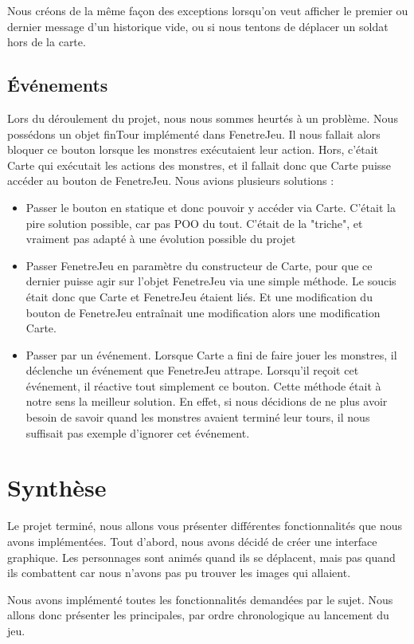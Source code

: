 \documentclass{article}
\begin{document}
  Nous créons de la même façon des exceptions lorsqu'on veut afficher le premier ou dernier message d'un historique vide, ou si nous tentons de déplacer un soldat hors de la carte.

  \subsection{Événements}
  Lors du déroulement du projet, nous nous sommes heurtés à un problème.
  Nous possédons un objet finTour implémenté dans FenetreJeu.
  Il nous fallait alors bloquer ce bouton lorsque les monstres exécutaient leur action.
  Hors, c'était Carte qui exécutait les actions des monstres, et il fallait donc que Carte puisse accéder au bouton de FenetreJeu.
  Nous avions plusieurs solutions :
  \begin{itemize}
    \item Passer le bouton en statique et donc pouvoir y accéder via Carte. C'était la pire solution possible, car pas POO du tout.
    C'était de la "triche", et vraiment pas adapté à une évolution possible du projet
    \item Passer FenetreJeu en paramètre du constructeur de Carte, pour que ce dernier puisse agir sur l'objet FenetreJeu via une simple méthode.
    Le soucis était donc que Carte et FenetreJeu étaient liés. Et une modification du bouton de FenetreJeu entraînait une modification alors une modification Carte.
    \item Passer par un événement. Lorsque Carte a fini de faire jouer les monstres, il déclenche un événement que FenetreJeu attrape.
    Lorsqu'il reçoit cet événement, il réactive tout simplement ce bouton. Cette méthode était à notre sens la meilleur solution.
    En effet, si nous décidions de ne plus avoir besoin de savoir quand les monstres avaient terminé leur tours, il nous suffisait pas exemple d'ignorer cet événement.
  \end{itemize}
 

\section{Synthèse}
Le projet terminé, nous allons vous présenter différentes fonctionnalités que nous avons implémentées.
Tout d'abord, nous avons décidé de créer une interface graphique.
Les personnages sont animés quand ils se déplacent, mais pas quand ils combattent car nous n'avons pas pu trouver les images qui allaient.

Nous avons implémenté toutes les fonctionnalités demandées par le sujet.
Nous allons donc présenter les principales, par ordre chronologique au lancement du jeu.
\end{document}
